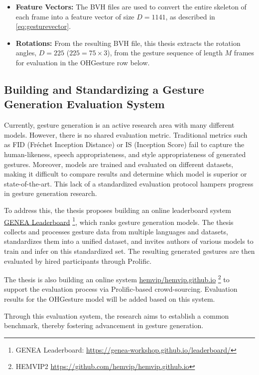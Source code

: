 \begin{itemize}[]
	\item \textbf{Feature Vectors:} The BVH files are used to convert the entire skeleton of each frame into a feature vector of size $D = 1141$, as described in \autoref{eq:gesturevector}.
	
	\item \textbf{Rotations:} From the resulting BVH file, this thesis extracts the rotation angles, $D = 225$ ($225 = 75 \times 3$), from the gesture sequence of length $M$ frames for evaluation in the OHGesture row below.
\end{itemize}

\subsection{Building and Standardizing a Gesture Generation Evaluation System}

Currently, gesture generation is an active research area with many different models. However, there is no shared evaluation metric. Traditional metrics such as FID (Fréchet Inception Distance) or IS (Inception Score) fail to capture the human-likeness, speech appropriateness, and style appropriateness of generated gestures. Moreover, models are trained and evaluated on different datasets, making it difficult to compare results and determine which model is superior or state-of-the-art. This lack of a standardized evaluation protocol hampers progress in gesture generation research.

To address this, the thesis proposes building an online leaderboard system \cite{nagy2024towards} \hyperlink{https://genea-workshop.github.io/leaderboard/}{GENEA Leaderboard} \footnote{GENEA Leaderboard: \url{https://genea-workshop.github.io/leaderboard/}}, which ranks gesture generation models. The thesis collects and processes gesture data from multiple languages and datasets, standardizes them into a unified dataset, and invites authors of various models to train and infer on this standardized set. The resulting generated gestures are then evaluated by hired participants through Prolific. 

The thesis is also building an online system \hyperlink{https://github.com/hemvip/hemvip.github.io}{hemvip/hemvip.github.io} \footnote{HEMVIP2 \url{https://github.com/hemvip/hemvip.github.io}} to support the evaluation process via Prolific-based crowd-sourcing. Evaluation results for the OHGesture model will be added based on this system.

Through this evaluation system, the research aims to establish a common benchmark, thereby fostering advancement in gesture generation.
